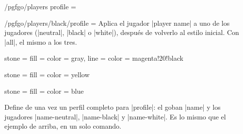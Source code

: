 \begin{goban}[9, stone = {radius = 4pt}, mark = {line = {color = red}}]
\begin{key}{/pgfgo/players profile = }
\begin{codeexample}[]
		\begin{goban}[3, players profile = pgfgo]
		\end{goban}
	\end{codeexample}
\end{key}

\begin{key}{/pgfgo/players/black/profile = }
	Aplica el jugador |player name| a uno de los jugadores (|neutral|, |black| o |white|), después de volverlo al estilo inicial. Con |all|, el mismo a los tres.
	\begin{codeexample}
	\end{codeexample}
\end{key}

\begin{codeexample}[width=3cm]
	{stone = {
			fill = {color = gray},
			line = {color = magenta!20!black}}
	}
	
	{stone = {fill = {color = yellow}}}
	
	{stone = {fill = {color = blue}}}
	
	
	\begin{goban}[partial = A1:C3]
	\end{goban}
\end{codeexample}

\begin{command}{\pgfgodefineprofile{}}
	Define de una vez un perfil completo para |profile|: el goban |name| y los jugadores |name-neutral|, |name-black| y |name-white|. Es lo mismo que el ejemplo de arriba, en un solo comando.

	\begin{codeexample}[width=3cm]



\end{codeexample}
\end{command}
\end{goban}
